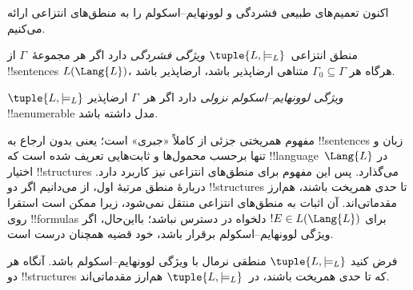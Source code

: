 \documentclass[../../../include/open-logic-section]{subfiles}
\begin{document}


اکنون تعمیم‌های طبیعی فشردگی و لوونهایم--اسکولم را به منطق‌های
انتزاعی ارائه می‌کنیم.

\begin{defn}
منطق انتزاعی~$\tuple{L, \models_L}$
\emph{ویژگی فشردگی} دارد اگر هر مجموعهٔ~$\Gamma$ از !!{sentence}s
$L(\Lang{L})$، هرگاه هر $\Gamma_0 \subseteq \Gamma$ متناهی ارضاپذیر
باشد، ارضاپذیر باشد.
\end{defn}

\begin{defn}
$\tuple{L, \models_L}$
\emph{ویژگی لوونهایم--اسکولم نزولی} دارد اگر هر~$\Gamma$ ارضاپذیر
!!a{enumerable} مدل داشته باشد.
\end{defn}


مفهوم همریختی جزئی از
 کاملاً «جبری» است؛ یعنی بدون ارجاع
به !!{sentence}s زبان و تنها برحسب محمول‌ها و ثابت‌هایی تعریف شده است
که !!{language}~$\Lang{L}$ در اختیار !!{structure}s می‌گذارد. پس این
مفهوم برای منطق‌های انتزاعی نیز کاربرد دارد. دربارهٔ منطق مرتبهٔ اول،
از
 می‌دانیم اگر دو !!{structure}s تا حدی
همریخت باشند، هم‌ارز مقدماتی‌اند. آن اثبات به منطق‌های انتزاعی منتقل
نمی‌شود، زیرا ممکن است استقرا روی !!{formula}s برای
$!E \in L(\Lang{L})$ دلخواه در دسترس نباشد؛ بااین‌حال، اگر ویژگی
لوونهایم--اسکولم برقرار باشد، خود قضیه همچنان درست است.

\begin{thm}
فرض کنید $\tuple{L, \models_L}$ منطقی نرمال با ویژگی
لوونهایم--اسکولم باشد. آنگاه هر دو !!{structure}s که تا حدی همریخت
باشند، در~$\tuple{L,\models_L}$ هم‌ارز مقدماتی‌اند.
\end{thm}
\end{document}
